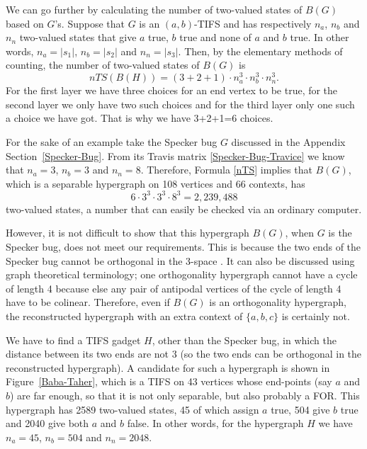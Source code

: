 \documentclass[%
12pt,
prereprint,
showpacs,
showkeys,
preprintnumbers,
amsmath,amssymb,
aps,
pra,
longbibliography,
notitlepage
]{revtex4-1}
\theoremstyle{definition}
\begin{document}
        We can go further by calculating the number of two-valued states of $B(G)$ based on $G$'s. Suppose that $G$ is an $(a,b)$-TIFS and has respectively $n_a$, $n_b$ and $n_n$ two-valued states that give $a$ true, $b$ true and none of $a$ and $b$ true. In other words, $n_a =\vert s_1 \vert$, $n_b = \vert s_2 \vert$ and $n_n = \vert s_3 \vert$. Then, by the elementary methods of counting, the number of two-valued states of $B(G)$ is
        \begin{equation}\label{nTS}
        nTS(B(H))= (3+2+1)\cdot n_a^3 \cdot n_b^3 \cdot n_n^3 .
        \end{equation}
    For the first layer we have three choices for an end vertex to be true, for the second layer we only have two such choices and for the third layer only one such a choice we have got. That is why we have 3+2+1=6 choices.

        For the sake of an example take the Specker bug $G$  discussed in the Appendix Section~\ref{Specker-Bug}. From its Travis matrix \ref{Specker-Bug-Travice} we know that $n_a = 3$, $n_b =3$ and $n_n=8$. Therefore, Formula \ref{nTS} implies that $B(G)$, which is a separable hypergraph on 108 vertices and 66 contexts, has $$6\cdot 3^3 \cdot 3^3\cdot 8^3=2,239,488$$ two-valued states, a number that can easily be checked via an ordinary computer.

        However, it is not difficult to show that this hypergraph $B(G)$, when $G$ is the Specker bug, does not meet our requirements. This is because the two ends of the Specker bug cannot be orthogonal in the 3-space \cite{Cabello-1996-diss}. It can also be discussed using graph theoretical terminology; one orthogonality hypergraph cannot have a cycle of length 4 because else any pair of antipodal vertices of the cycle of length 4 have to be colinear. Therefore, even if $B(G)$ is an orthogonality hypergraph, the reconstructed hypergraph with an extra context of $\{a,b,c\}$ is certainly not.

        We have to find a TIFS gadget $H$, other than the Specker bug, in which the distance between its two ends are not 3 (so the two ends can be orthogonal in the reconstructed hypergraph). A candidate for such a hypergraph is shown in Figure~\ref{Baba-Taher}, which is a TIFS on 43 vertices whose end-points (say $a$ and $b$) are far enough, so that it is not only separable, but also probably a FOR. This hypergraph has 2589 two-valued states, 45 of which assign $a$ true, 504 give $b$ true and 2040 give both $a$ and $b$ false. In other words, for the hypergraph $H$ we have $n_a=45$, $n_b=504$ and $n_n=2048$.
\end{document}
